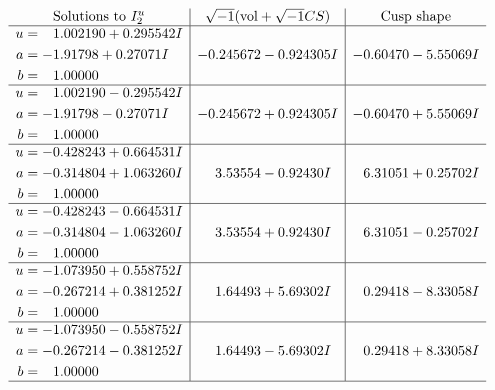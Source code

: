 \documentclass[1p]{elsarticle_modified}
\theoremstyle{definition}
\newcommand{\I}{\sqrt{-1}}
\begin{document}
$$\begin{array}{c|c|c}  
\text{Solutions to }I^u_{2}& \I (\text{vol} + \sqrt{-1}CS) & \text{Cusp shape}\\
 \hline 
\begin{aligned}
u &= \phantom{-}1.002190 + 0.295542 I \\
a &= -1.91798 + 0.27071 I \\
b &= \phantom{-}1.00000\phantom{ +0.000000I}\end{aligned}
 & -0.245672 - 0.924305 I & -0.60470 - 5.55069 I \\ \hline\begin{aligned}
u &= \phantom{-}1.002190 - 0.295542 I \\
a &= -1.91798 - 0.27071 I \\
b &= \phantom{-}1.00000\phantom{ +0.000000I}\end{aligned}
 & -0.245672 + 0.924305 I & -0.60470 + 5.55069 I \\ \hline\begin{aligned}
u &= -0.428243 + 0.664531 I \\
a &= -0.314804 + 1.063260 I \\
b &= \phantom{-}1.00000\phantom{ +0.000000I}\end{aligned}
 & \phantom{-}3.53554 - 0.92430 I & \phantom{-}6.31051 + 0.25702 I \\ \hline\begin{aligned}
u &= -0.428243 - 0.664531 I \\
a &= -0.314804 - 1.063260 I \\
b &= \phantom{-}1.00000\phantom{ +0.000000I}\end{aligned}
 & \phantom{-}3.53554 + 0.92430 I & \phantom{-}6.31051 - 0.25702 I \\ \hline\begin{aligned}
u &= -1.073950 + 0.558752 I \\
a &= -0.267214 + 0.381252 I \\
b &= \phantom{-}1.00000\phantom{ +0.000000I}\end{aligned}
 & \phantom{-}1.64493 + 5.69302 I & \phantom{-}0.29418 - 8.33058 I \\ \hline\begin{aligned}
u &= -1.073950 - 0.558752 I \\
a &= -0.267214 - 0.381252 I \\
b &= \phantom{-}1.00000\phantom{ +0.000000I}\end{aligned}
 & \phantom{-}1.64493 - 5.69302 I & \phantom{-}0.29418 + 8.33058 I\\
 \hline 
 \end{array}$$\newpage\newpage\renewcommand{\arraystretch}{1}
\end{document}
